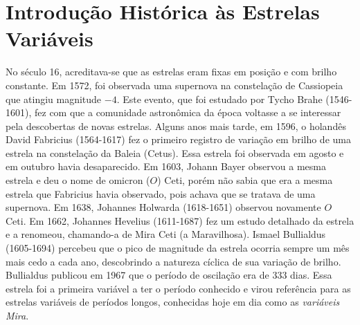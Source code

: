 


\section{Introdução Histórica às Estrelas Variáveis}

No século 16, acreditava-se que as estrelas eram fixas em posição e com brilho constante. Em 1572, foi observada uma supernova na constelação de Cassiopeia que atingiu magnitude $-4$. Este evento, que foi estudado por Tycho Brahe (1546-1601), fez com que a comunidade astronômica da época voltasse a se interessar pela descobertas de novas estrelas. Alguns anos mais tarde, em 1596, o holandês David Fabricius (1564-1617) fez o primeiro registro de variação em brilho de uma estrela na constelação da Baleia (Cetus).  Essa estrela foi observada em agosto e em outubro havia desaparecido. Em 1603, Johann Bayer observou a mesma estrela e deu o nome de omicron ($O$) Ceti, porém não sabia que era a mesma estrela que Fabricius havia observado, pois achava que se tratava de uma supernova. Em 1638, Johannes Holwarda (1618-1651) observou novamente $O$ Ceti. Em 1662, Johannes Hevelius (1611-1687) fez um estudo detalhado da estrela e a renomeou, chamando-a de Mira Ceti (a Maravilhosa). Ismael Bullialdus (1605-1694) percebeu que o pico de magnitude da estrela ocorria sempre um mês mais cedo a cada ano, descobrindo a natureza cíclica de sua variação de brilho. Bullialdus publicou em 1967 que o período de oscilação era de 333 dias. Essa estrela foi a primeira variável a ter o período conhecido e virou referência para as estrelas variáveis de períodos longos, conhecidas hoje em dia como as \textit{variáveis Mira}.

